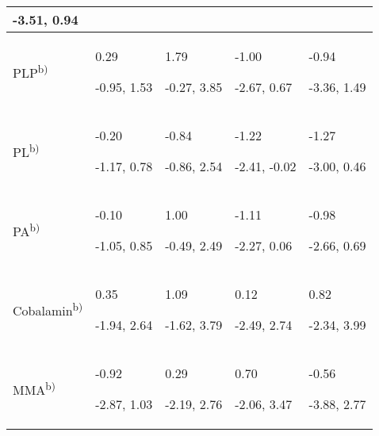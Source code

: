 \begin{landscape}
\begin{supertabular}{m{2.5cm}m{4.0cm}m{4.0cm}m{4cm}m{4cm}}
 {}-3.51, 0.94\\\hline
 PLP\textsuperscript{b)} &
{ 0.29}

 {}-0.95, 1.53 &
{ 1.79}

 {}-0.27, 3.85 &
{ {}-1.00}

 {}-2.67, 0.67 &
{ {}-0.94}

 {}-3.36, 1.49\\\hline
 PL\textsuperscript{b)} &
{ {}-0.20}

 {}-1.17, 0.78 &
{ {}-0.84}

 {}-0.86, 2.54 &
{ {}-1.22}

 {}-2.41, -0.02 &
{ {}-1.27}

 {}-3.00, 0.46\\\hline
 PA\textsuperscript{b)} &
{ {}-0.10}

 {}-1.05, 0.85 &
{ 1.00}

 {}-0.49, 2.49 &
{ {}-1.11}

 {}-2.27, 0.06 &
{ {}-0.98}

 {}-2.66, 0.69\\\hline
 Cobalamin\textsuperscript{b)} &
{ 0.35}

 {}-1.94, 2.64 &
{ 1.09}

 {}-1.62, 3.79 &
{ 0.12}

 {}-2.49, 2.74 &
{ 0.82}

 {}-2.34, 3.99\\\hline
 MMA\textsuperscript{b)} &
{ {}-0.92}

 {}-2.87, 1.03 &
{ 0.29}

 {}-2.19, 2.76 &
{ 0.70}

 {}-2.06, 3.47 &
{ {}-0.56}

 {}-3.88, 2.77\\\hline
\end{supertabular}
\end{landscape}



